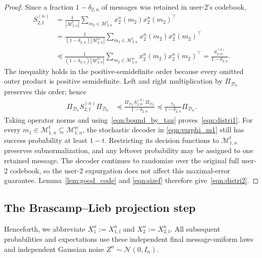 \documentclass[11pt,onecolumn]{IEEEtran}
\newcommand{\nn}{\nonumber}
\newcommand{\calD}{\mathcal{D}}
\newcommand{\calM}{\mathcal{M}}
\newcommand{\calN}{\mathcal{N}}
\newcommand{\rmf}{\mathrm{f}}
\newcommand{\rc}{\mathrm{rc}}
\begin{document}
\begin{proof}
Since a fraction $1-\delta_{2,n}$ of messages was retained in user-2's codebook,
\begin{align}
    S_{2,\rmf}^{(n)} &= \frac{1}{|\calM_{2,n}^{\rmf}|}\sum_{m_2 \in \calM_{2,n}^{\rmf}} x_2^n(m_2)  x_2^n(m_2)^\top\nn \\
    &= \frac{1}{(1-\delta_{2,n})|\calM_{2,n}^{\rc}|}\sum_{m_2 \in \calM_{2,n}^{\rmf}} x_2^n(m_2) x_2^n(m_2)^\top \nn\\
    &\preceq \frac{1}{(1-\delta_{2,n})|\calM_{2,n}^{\rc}|}\sum_{m_2 \in \calM_{2,n}^{\rc}} x_2^n(m_2)x_2^n(m_2)^\top = \frac{S_{2,\rc}^{(n)}}{1-\delta_{2,n}}.
\end{align}
The inequality holds in the positive-semidefinite  order because every omitted outer
product is positive semidefinite. Left and right multiplication by $\Pi_{\calD_n}$ preserves
this order; hence
\begin{align}
\Pi_{\calD_n}S_{2,\rmf}^{(n)}\Pi_{\calD_n}
&\preceq
\frac{
\Pi_{\calD_n}S_{2,\rc}^{(n)}\Pi_{\calD_n}}
{1-\delta_{2,n}} 
\preceq
\frac{\tau_n}{1-\delta_{2,n}}\Pi_{\calD_n}.
\end{align}
Taking operator norms and using~\eqref{eqn:bound_by_tau} proves~\eqref{eqn:distri1}. For
every $m_1\in \calM_{1,n}^{\rmf}\subseteq \calM_{1,n}^{\rc}$, the stochastic decoder in \eqref{eqn:varphi_m1} still has success probability at least $1-t$.
Restricting its decision functions to $\calM_{1,n}^{\rmf}$  preserves subnormalization, and any leftover probability may be assigned to one retained message. The decoder continues to randomize over the original full user-2 codebook, so the user-2 expurgation does not affect this maximal-error guarantee. Lemma~\ref{lem:good_code}
and \eqref{eqn:sizef} therefore give~\eqref{eqn:distri2}.\end{proof}

\subsection{The Brascamp--Lieb projection step} \label{sec:bl}
Henceforth, we abbreviate $X_1^n := X_{1,\rmf}^n$ and  $X_2^n := X_{2,\rmf}^n$. All
subsequent probabilities and expectations use these independent final message-uniform laws and  independent Gaussian noise $Z^n\sim\calN(0,I_n)$.
\end{document}
